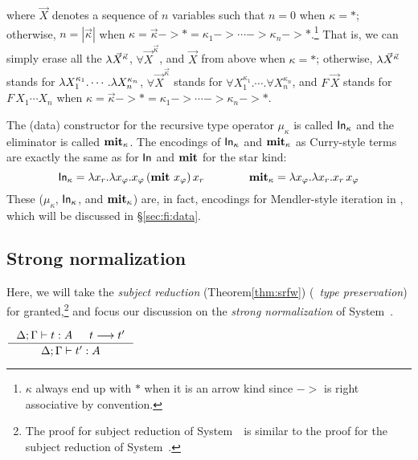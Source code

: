 where $\vec{X}$ denotes a sequence of $n$ variables
such that $n=0$ when $\kappa = *$; otherwise, $n = |\vec{\kappa}|$ when
$\kappa = \vec{\kappa} -> * = \kappa_1 -> \cdots -> \kappa_n -> *$.\footnote{
        $\kappa$ always end up with $*$ when it is an arrow kind
        since $->$ is right associative by convention.}
That is, we can simply erase all the $\lambda \vec{X}^{\vec{\kappa}}$,
$\forall \vec{X}^{\vec{\kappa}}$, and $\vec{X}$ from above when
$\kappa = *$; otherwise, $\lambda \vec{X}^{\vec{\kappa}}$ stands for
$\lambda X_1^{\kappa_1}.\cdots.\lambda X_n^{\kappa_n}$,
$\forall \vec{X}^{\vec{\kappa}}$ stands for
$\forall X_1^{\kappa_1}.\cdots.\forall X_n^{\kappa_n}$,
and $F\,\vec{X}$ stands for $F\,X_1\cdots X_n$
when $\kappa = \vec{\kappa} -> * = \kappa_1 -> \cdots -> \kappa_n -> *$.

The (data) constructor for the recursive type operator $\mu_\kappa$ is
called $\mathsf{In}_\kappa$ and the eliminator is called $\mathbf{mit}_\kappa$.
The encodings of $\mathsf{In}_\kappa$ and $\mathbf{mit}_\kappa$ as Curry-style terms are
exactly the same as for $\mathsf{In}$ and $\mathbf{mit}$ for the star kind:
\[ \mathsf{In}_\kappa = \lambda x_r. \lambda x_\varphi.x_\varphi\,(\mathbf{mit}~x_\varphi)\,x_r
\qquad\qquad \mathbf{mit}_\kappa = \lambda x_\varphi.\lambda x_r.x_r\,x_\varphi \]
These ($\mu_\kappa$, $\mathsf{In}_\kappa$, and $\mathbf{mit}_\kappa$) are, in fact,
encodings for Mendler-style iteration in \Fw, which will be discussed in
\S\ref{sec:fi:data}.


\subsection{Strong normalization}\label{sec:fw:srsn}
Here, we will take the \emph{subject reduction} (Theorem\;\ref{thm:srfw})
(\aka\ \emph{type preservation}) for granted,\footnote{
	The proof for subject reduction of System~\Fw\ is similar to
	the proof for the subject reduction of System~\F.}
and focus our discussion on the \emph{strong normalization}
of System~\Fw.

\begin{theorem}\label{thm:srfw}
$\inference{\Delta;\Gamma |- t : A  & t --> t'}{\Delta;\Gamma |- t' : A}$
\end{theorem}

